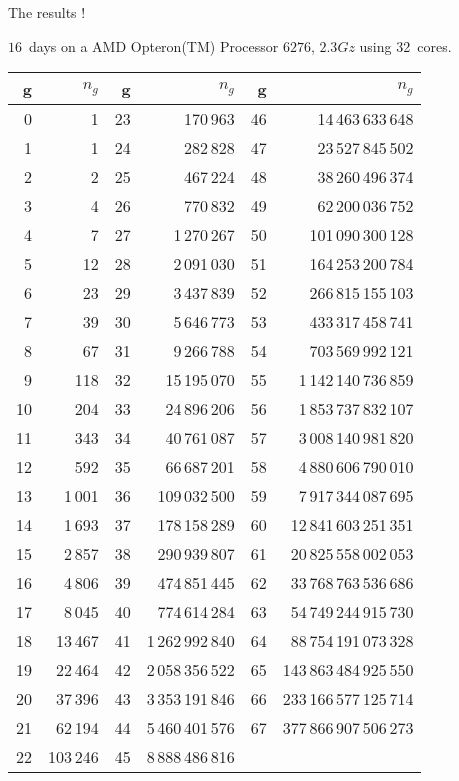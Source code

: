 \documentclass[compress,11pt]{beamer}
\begin{document}
\begin{frame}[fragile]{The results !}

$16$~days on a AMD Opteron(TM) Processor $6276$, $2.3Gz$ using 32~cores.

\tiny
\begin{center}
\begin{tabular}{|r|r||r|r||r|r|}
\hline
g & $n_g$ & g & $n_g$ & g & $n_g$ \\
\hline
0 & 1 & 23 & 170\,963 & 46 & 14\,463\,633\,648\\
1 & 1 & 24 & 282\,828 & 47 & 23\,527\,845\,502\\
2 & 2 & 25 & 467\,224 & 48 & 38\,260\,496\,374\\
3 & 4 & 26 & 770\,832 & 49 & 62\,200\,036\,752\\
4 & 7 & 27 & 1\,270\,267 & 50 & 101\,090\,300\,128\\
5 & 12 & 28 & 2\,091\,030 & 51 & 164\,253\,200\,784\\
6 & 23 & 29 & 3\,437\,839 & 52 & 266\,815\,155\,103\\
7 & 39 & 30 & 5\,646\,773 & 53 & 433\,317\,458\,741\\
8 & 67 & 31 & 9\,266\,788 & 54 & 703\,569\,992\,121\\
9 & 118 & 32 & 15\,195\,070 & 55 & 1\,142\,140\,736\,859\\
10 & 204 & 33 & 24\,896\,206 & 56 & 1\,853\,737\,832\,107\\
11 & 343 & 34 & 40\,761\,087 & 57 & 3\,008\,140\,981\,820\\
12 & 592 & 35 & 66\,687\,201 & 58 & 4\,880\,606\,790\,010\\
13 & 1\,001 & 36 & 109\,032\,500 & 59 & 7\,917\,344\,087\,695\\
14 & 1\,693 & 37 & 178\,158\,289 & 60 & 12\,841\,603\,251\,351\\
15 & 2\,857 & 38 & 290\,939\,807 & 61 & 20\,825\,558\,002\,053\\
16 & 4\,806 & 39 & 474\,851\,445 & 62 & 33\,768\,763\,536\,686\\
17 & 8\,045 & 40 & 774\,614\,284 & 63 & 54\,749\,244\,915\,730\\
18 & 13\,467 & 41 & 1\,262\,992\,840 & 64 & 88\,754\,191\,073\,328\\
19 & 22\,464 & 42 & 2\,058\,356\,522 & 65 & 143\,863\,484\,925\,550\\
20 & 37\,396 & 43 & 3\,353\,191\,846 & 66 & 233\,166\,577\,125\,714\\
21 & 62\,194 & 44 & 5\,460\,401\,576 & 67 & 377\,866\,907\,506\,273\\
22 & 103\,246 & 45 & 8\,888\,486\,816 & &\\
\hline
\end{tabular}
\end{center}
\end{frame}
\end{document}
